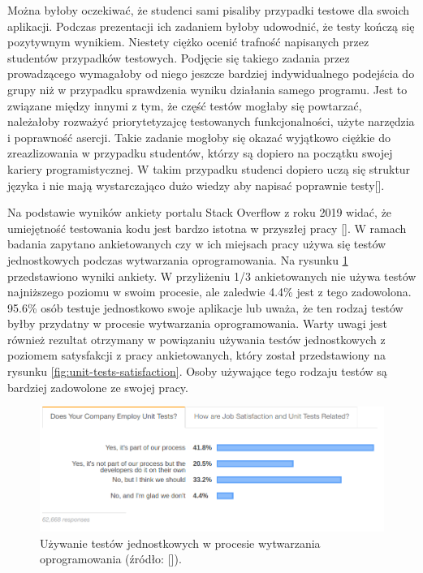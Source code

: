 Można byłoby oczekiwać, że studenci sami pisaliby przypadki testowe dla swoich aplikacji. 
Podczas prezentacji ich zadaniem byłoby udowodnić, że testy kończą się pozytywnym wynikiem.
Niestety ciężko ocenić trafność napisanych przez studentów przypadków testowych.
Podjęcie się takiego zadania przez prowadzącego wymagałoby od niego jeszcze bardziej indywidualnego podejścia do grupy niż w przypadku sprawdzenia wyniku działania samego programu.
Jest to związane między innymi z tym, że część testów mogłaby się powtarzać, należałoby rozważyć priorytetyzajcę testowanych funkcjonalności, użyte narzędzia i poprawność asercji.
Takie zadanie mogłoby się okazać wyjątkowo ciężkie do zreazlizowania w przypadku studentów, którzy są dopiero na początku swojej kariery programistycznej.
W takim przypadku studenci dopiero uczą się struktur języka i nie mają wystarczająco dużo wiedzy aby napisać poprawnie testy[].

Na podstawie wyników ankiety portalu Stack Overflow z roku 2019 widać, że umiejętność testowania kodu jest bardzo istotna w przyszłej pracy [].
W ramach badania zapytano ankietowanych czy w ich miejsach pracy używa się testów jednostkowych podczas wytwarzania oprogramowania.
Na rysunku \ref{fig:unit-tests-use} przedstawiono wyniki ankiety.
W przyliżeniu 1/3 ankietowanych nie używa testów najniższego poziomu w swoim procesie, ale zaledwie 4.4\% jest z tego zadowolona.
95.6\% osób testuje jednostkowo swoje aplikacje lub uważa, że ten rodzaj testów byłby przydatny w procesie wytwarzania oprogramowania. 
Warty uwagi jest również rezultat otrzymany w powiązaniu używania testów jednostkowych z poziomem satysfakcji z pracy ankietowanych, który został przedstawiony na rysunku \ref{fig:unit-tests-satisfaction}.
Osoby używające tego rodzaju testów są bardziej zadowolone ze swojej pracy.

\begin{figure}[h]
    \centering
    \includegraphics[width = 13cm]{chapter01/unit-tests-use.png}
    \caption{Używanie testów jednostkowych w procesie wytwarzania oprogramowania (źródło: []).}
    \label{fig:unit-tests-use}
\end{figure}

